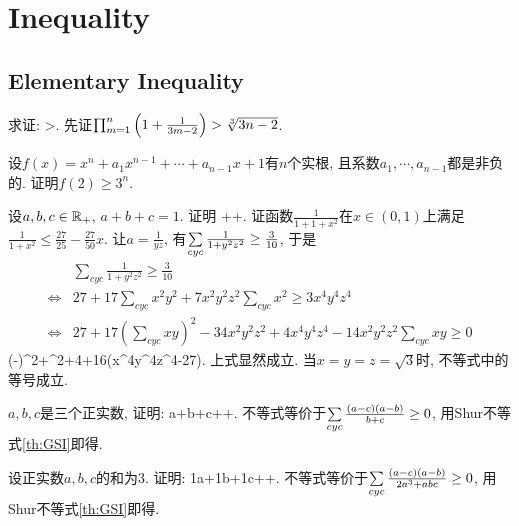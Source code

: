 \chapter{Inequality}
\section{Elementary Inequality}
\bq{}{}
求证: 
\bee
{}\cdots{}>.
\eee
\eq
\ba
先证$\prod_{m=1}^n\left(1+\frac{1}{3m-2}\right)>\sqrt[3]{3n-2}$.
\ea

\bq{}{}
设$f(x)=x^n+a_1x^{n-1}+\cdots+a_{n-1}x+1$有$n$个实根, 且系数$a_1,\cdots,a_{n-1}$都是非负的. 证明$f(2)\ge3^n$.
\eq

\bq{}{}
设$a,b,c\in\mathbb{R}_{+}$, $a+b+c=1$. 证明
\be
{}++\le{}.
\ee
\eq
\ba
证函数$\frac{1}{1+1+x^{2}}$在$x\in\left(0,1\right)$上满足$\frac{1}{1+x^{2}}\le\frac{27}{25}-\frac{27}{50}x$.
\ea
\ba
让$a=\frac{1}{yz}$, 有$\sum\limits_{cyc}\frac{1}{1+y^{2}z^{2}}\ge\frac{3}{10}$,
于是
\begin{align*}
	& \sum_{cyc}\frac{1}{1+y^{2}z^{2}} \ge \frac{3}{10}\\
	\Leftrightarrow & 27+17\sum_{cyc}x^{2}y^{2}+7x^{2}y^{2}z^{2}\sum_{cyc}x^{2}\ge3x^{4}y^{4}z^{4}\\
	\Leftrightarrow & 27+17\left(\sum_{cyc}xy\right)^{2}-34x^{2}y^{2}z^{2}+4x^{4}y^{4}z^{4}-14x^{2}y^{2}z^{2}\sum_{cyc}xy\ge0
\end{align*}
\left(-\right)^{2}+^{2}+4+16\left(x^{4}y^{4}z^{4}-27\right).
\ee
上式显然成立. 当$x=y=z=\sqrt{3}$时, 不等式中的等号成立.
\ea

$a,b,c$是三个正实数, 证明:
\bee
a+b+c\le{}++.
\eee
\eq
\ba
不等式等价于$\sum\limits_{cyc}\frac{(a-c)(a-b)}{b+c}\ge0$, 用Shur不等式\ref{th:GSI}即得.
\ea

\bq{}{}
设正实数$a,b,c$的和为$3$. 证明:
\bee
\frac1a+\frac1b+\frac1c\ge{}++.
\eee
\eq
\ba
不等式等价于$\sum\limits_{cyc}\frac{(a-c)(a-b)}{2a^3+abc}\ge0$, 用Shur不等式\ref{th:GSI}即得.
\ea


